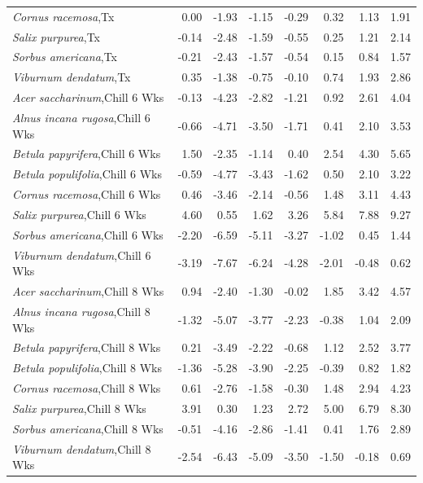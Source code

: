 \documentclass{article}\usepackage[]{graphicx}\usepackage[]{color}
\begin{document}
\begin{longtable}{lrrrrrrr}
  \textit{Cornus racemosa},Tx & 0.00 & -1.93 & -1.15 & -0.29 & 0.32 & 1.13 & 1.91 \\ 
  \textit{Salix purpurea},Tx & -0.14 & -2.48 & -1.59 & -0.55 & 0.25 & 1.21 & 2.14 \\ 
  \textit{Sorbus americana},Tx & -0.21 & -2.43 & -1.57 & -0.54 & 0.15 & 0.84 & 1.57 \\ 
  \textit{Viburnum dendatum},Tx & 0.35 & -1.38 & -0.75 & -0.10 & 0.74 & 1.93 & 2.86 \\ 
  \textit{Acer saccharinum},Chill 6 Wks & -0.13 & -4.23 & -2.82 & -1.21 & 0.92 & 2.61 & 4.04 \\ 
  \textit{Alnus incana rugosa},Chill 6 Wks & -0.66 & -4.71 & -3.50 & -1.71 & 0.41 & 2.10 & 3.53 \\ 
  \textit{Betula papyrifera},Chill 6 Wks & 1.50 & -2.35 & -1.14 & 0.40 & 2.54 & 4.30 & 5.65 \\ 
  \textit{Betula populifolia},Chill 6 Wks & -0.59 & -4.77 & -3.43 & -1.62 & 0.50 & 2.10 & 3.22 \\ 
  \textit{Cornus racemosa},Chill 6 Wks & 0.46 & -3.46 & -2.14 & -0.56 & 1.48 & 3.11 & 4.43 \\ 
  \textit{Salix purpurea},Chill 6 Wks & 4.60 & 0.55 & 1.62 & 3.26 & 5.84 & 7.88 & 9.27 \\ 
  \textit{Sorbus americana},Chill 6 Wks & -2.20 & -6.59 & -5.11 & -3.27 & -1.02 & 0.45 & 1.44 \\ 
  \textit{Viburnum dendatum},Chill 6 Wks & -3.19 & -7.67 & -6.24 & -4.28 & -2.01 & -0.48 & 0.62 \\ 
  \textit{Acer saccharinum},Chill 8 Wks & 0.94 & -2.40 & -1.30 & -0.02 & 1.85 & 3.42 & 4.57 \\ 
  \textit{Alnus incana rugosa},Chill 8 Wks & -1.32 & -5.07 & -3.77 & -2.23 & -0.38 & 1.04 & 2.09 \\ 
  \textit{Betula papyrifera},Chill 8 Wks & 0.21 & -3.49 & -2.22 & -0.68 & 1.12 & 2.52 & 3.77 \\ 
  \textit{Betula populifolia},Chill 8 Wks & -1.36 & -5.28 & -3.90 & -2.25 & -0.39 & 0.82 & 1.82 \\ 
  \textit{Cornus racemosa},Chill 8 Wks & 0.61 & -2.76 & -1.58 & -0.30 & 1.48 & 2.94 & 4.23 \\ 
  \textit{Salix purpurea},Chill 8 Wks & 3.91 & 0.30 & 1.23 & 2.72 & 5.00 & 6.79 & 8.30 \\ 
  \textit{Sorbus americana},Chill 8 Wks & -0.51 & -4.16 & -2.86 & -1.41 & 0.41 & 1.76 & 2.89 \\ 
  \textit{Viburnum dendatum},Chill 8 Wks & -2.54 & -6.43 & -5.09 & -3.50 & -1.50 & -0.18 & 0.69 \\ 

\end{longtable}
\end{document}
